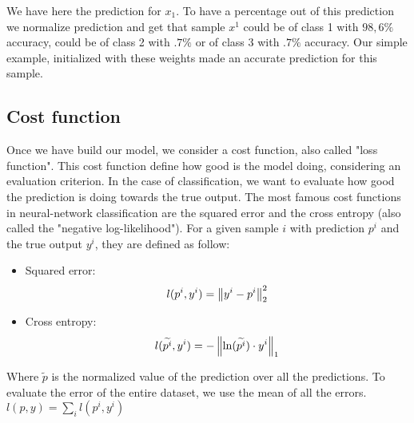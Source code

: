 		We have here the prediction for $x_1$. To have a percentage out of this prediction we normalize prediction and get that sample $x^1$ could be of class 1 with $98,6\%$ accuracy, could be of class 2 with $.7\%$ or of class 3 with $.7\%$ accuracy. Our simple example, initialized with these weights made an accurate prediction for this sample.
	

	\subsection{Cost function}
	\label{sec:cost_function}
		Once we have build our model, we consider a cost function, also called "loss function". This cost function define how good is the model doing, considering an evaluation criterion. In the case of classification, we want to evaluate how good the prediction is doing towards the true output.
		The most famous cost functions in neural-network classification are the squared error and the cross entropy (also called the "negative log-likelihood"). For a given sample $i$ with prediction $p^i$ and the true output $y^i$, they are defined as follow:
		\begin{itemize}
			\item Squared error: $$ l(p^i,y^i) = \left\lVert y^i - p^i\right\rVert_2^2 $$
			\item Cross entropy: $$ l(\widetilde{p^i},y^i) = -\left\lVert\ln(\widetilde{p^i})\cdot{y^i}\right\rVert_1  $$
		\end{itemize}
		Where $ \tilde{p} $ is the normalized value of the prediction over all the predictions. To evaluate the error of the entire dataset, we use the mean of all the errors. $l(p,y) = \sum_i l(p^i,y^i)$

